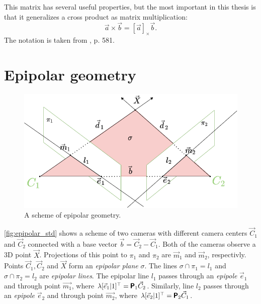 This matrix has several useful properties, but the most important in this thesis is that it generalizes a cross product as matrix multiplication:
\begin{equation}
    \vec{a} \times \vec{b} = [\vec{a}]_{\times} \vec{b}.
\end{equation}
The notation is taken from \cite{hartley_zisserman_2004}, p. 581.

\section{Epipolar geometry}
\label{sec:epipolar_geometry}
\begin{figure}[ht]
    \centering
    \includegraphics[width=\textwidth]{graphics/epipolar.png}
    \caption{A scheme of epipolar geometry.}
    \label{fig:epipolar_std}
\end{figure}

\autoref{fig:epipolar_std} shows a scheme of two cameras with different camera centers $\vec{C}_1$ and $\vec{C}_2$ connected with a base vector $\vec{b} = \vec{C}_2 - \vec{C}_1$. 
Both of the cameras observe a 3D point $\vec{X}$. 
Projections of this point to $\pi_1$ and $\pi_2$ are $\vec{m}_1$ and $\vec{m}_2$, respectivly. 
Points $\vec{C}_1, \vec{C}_2$ and $\vec{X}$ form an \textit{epipolar plane} $\sigma$.
The lines $\sigma \cap \pi_1 = l_1$ and $\sigma \cap \pi_2 = l_2$ are \textit{epipolar lines}. 
The epipolar line $l_1$ passes through an \textit{epipole} $\vec{e}_1$ and through point $\vec{m_1}$, where $\lambda [\vec{e}_1 | 1]^\top = \pmb{\mathsf{P}}_1 \vec{C}_2$.
Similarly, line $l_2$ passes through an \textit{epipole} $\vec{e}_2$ and through point $\vec{m_2}$, where $\lambda [\vec{e}_2 | 1]^\top = \pmb{\mathsf{P}}_2 \vec{C}_1$.

